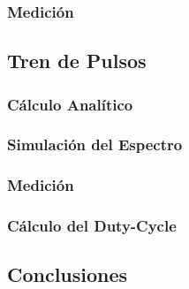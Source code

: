 \subsubsection{Medición}

\subsection{Tren de Pulsos}

\subsubsection{Cálculo Analítico}

\subsubsection{Simulación del Espectro}

\subsubsection{Medición}

\subsubsection{Cálculo del Duty-Cycle}

\subsection{Conclusiones}
